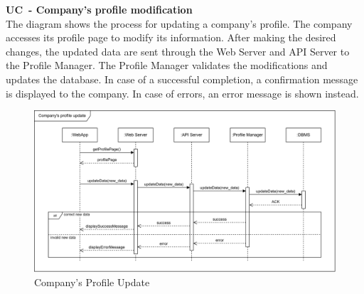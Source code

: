 \textbf{UC\cuc\  - Company's profile modification} \\
The diagram shows the process for updating a company's profile. The company accesses its profile page to modify its information. After making the desired changes, the updated data are sent through the Web Server and API Server to the Profile Manager. The Profile Manager validates the modifications and updates the database. In case of a successful completion, a confirmation message is displayed to the company. In case of errors, an error message is shown instead.
\begin{center}
    \begin{figure}[H]
        \centering
        \includegraphics[width=1\linewidth]{Images/Sequence diagrams/UC11.png}
        \caption{Company's Profile Update}
        \label{fig:enter-label}
    \end{figure}
\end{center}

